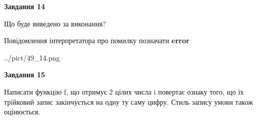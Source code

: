 \documentclass[11pt, ukrainian]{article}
\begin{document}
{\begin {large}
{\begin {center}\textbf{Завдання 14}\end {center}}\par
Що буде виведено за виконання? \par
Повідомлення інтерпретатора про помилку позначати \textbf{error}

\begin{center}
	{../pict/49_14.png}
\end{center}
\newpage

{\begin {center}\textbf{Завдання 15}\end {center}}\par

Написати функцiю f, що отримує 2 цілих числа i повертає ознаку того, що їх трійковий запис закінчується на одну ту саму цифру. Стиль запису умови також оцінюється.\par
\newpage

\end {large}}
\end{document}
